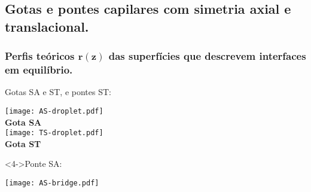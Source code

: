 \documentclass[8pt]{beamer}
\begin{document}
\subsection{Gotas e pontes capilares com simetria axial e translacional.}
\begin{frame}
\frametitle{\textbf{Perfis teóricos} $\mathbf{r(z)}$ das superfícies que descrevem interfaces em equilíbrio.}
	\vspace{-0.2cm}
	\begin{block}{ Gotas SA e ST, e pontes ST:}
		\begin{minipage}{0.2\textwidth}
			\begin{center}
				\texttt{[image: AS-droplet.pdf]}\\
				{\bf \small  Gota SA}\\
				\texttt{[image: TS-droplet.pdf]}\\
				{\bf \small  Gota ST}\\
			\end{center}
		\end{minipage}
		\begin{minipage}{0.3\textwidth}
		\end{minipage}
		\hspace{1cm}
		\begin{minipage}{0.35\textwidth}
			\centering
		\end{minipage}
	\end{block}	
	\vspace{-0.2cm}
	\begin{block}<4->{Ponte SA:}
		\begin{minipage}{0.2\textwidth}
			\texttt{[image: AS-bridge.pdf]}\\
		\end{minipage}
		\begin{minipage}{0.79\textwidth}
		\end{minipage}
	\end{block}	
\end{frame}
\end{document}
